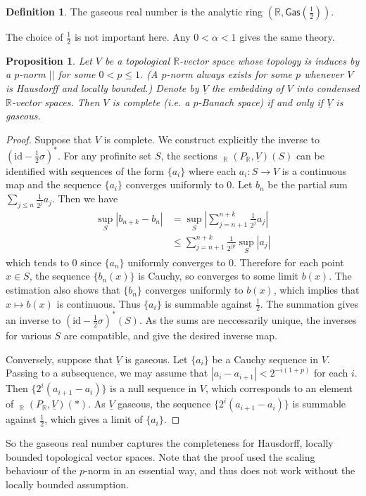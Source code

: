 \documentclass{article}
\theoremstyle{plain}
\newtheorem{prop}[thm]{Proposition}
\theoremstyle{definition}
\newtheorem{defi}[thm]{Definition}
\theoremstyle{remark}
\DeclareMathOperator{\Homs}{\underline{Hom}}
\begin{document}
\begin{defi}
The gaseous real number is the analytic ring $ (\mathbb{R}, \mathsf{Gas}(\frac{1}{2})) $.
\end{defi}

The choice of $ \frac{1}{2} $ is not important here. Any $ 0<\alpha <1 $ gives the same theory.

\begin{prop}
Let $ V $ be a topological $ \mathbb{R} $-vector space whose topology is induces by a $ p $-norm $ || $ for some $ 0<p\leq 1 $.
(A $ p $-norm always exists for some $ p $ whenever $ V $ is Hausdorff and locally bounded.)
Denote by $ \underline{V} $ the embedding of $ V $ into condensed $ \mathbb{R} $-vector spaces.
Then $ V $ is complete (i.e. a $ p $-Banach space) if and only if $ \underline{V} $ is gaseous.
\end{prop}

\begin{proof}
Suppose that $ V $ is complete. We construct explicitly the inverse to $ (\mathrm{id} - \frac{1}{2}\sigma)^{*} $.
For any profinite set $ S $, the sections $ \Homs _{\mathbb{R}}(P _{\mathbb{R}}, \underline{V})(S) $
can be identified with sequences of the form $ \{a _{i}\} $ where each $ a _{i}: S\to V $ is a continuous map
and the sequence $ \{a _{i}\} $ converges uniformly to $ 0 $.
Let $ b _{n} $ be the partial sum $ \sum _{j\leq n} \frac{1}{2 ^{j}} a _{j} $.
Then we have
\begin{align*}
\sup _{S}|b _{n+k} - b _{n}|
&= \sup _{S}|\sum _{j=n+1}^{n+k} \frac{1}{2 ^{j}}a _{j}|\\
&\leq \sum _{j=n+1}^{n+k} \frac{1}{2 ^{jp}} \sup _{S}|a _{j}|
\end{align*}
which tends to $ 0 $ since $ \{a _{n}\} $ uniformly converges to $ 0 $.
Therefore for each point $ x\in S $, the sequence $ \{b _{n}(x)\} $ is Cauchy, so converges to some limit $ b (x) $.
The estimation also shows that $ \{b _{n}\} $ converges uniformly to $ b (x) $,
which implies that $ x\mapsto b (x) $ is continuous.
Thus $ \{a _{i}\} $ is summable against $ \frac{1}{2} $.
The summation gives an inverse to $ (\mathrm{id}-\frac{1}{2}\sigma)^{*}(S) $.
As the sums are neccessarily unique, the inverses for various $ S $ are compatible,
and give the desired inverse map.

Conversely, suppose that $ \underline{V} $ is gaseous.
Let $ \{a _{i}\} $ be a Cauchy sequence in $ V $.
Passing to a subsequence, we may assume that $ |a _{i} - a _{i+1}| < 2 ^{-i(1+p)} $ for each $ i $.
Then $ \{2 ^{i}(a _{i+1}- a _{i})\} $ is a null sequence in $ V $, which corresponds to an element of
$ \Homs _{\mathbb{R}}(P _{\mathbb{R}}, \underline{V})(*) $.
As $ \underline{V} $ gaseous, the sequence $ \{2 ^{i}(a _{i+1}-a _{i})\} $ is summable against $ \frac{1}{2} $,
which gives a limit of $ \{a _{i}\} $.
\end{proof}

So the gaseous real number captures the completeness for Hausdorff, locally bounded topological vector spaces.
Note that the proof used the scaling behaviour of the $ p $-norm in an essential way,
and thus does not work without the locally bounded assumption.
%

\printbibliography
\end{document}
